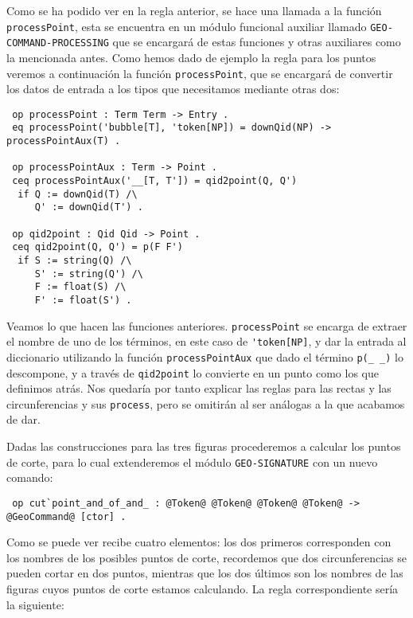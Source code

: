 Como se ha podido ver en la regla anterior, se hace una llamada a la función  \verb"processPoint", esta se encuentra en un módulo funcional auxiliar llamado \verb"GEO-COMMAND-PROCESSING" que se encargará de estas funciones y otras auxiliares como la mencionada antes. Como hemos dado de ejemplo la regla para los puntos veremos a continuación la función \verb"processPoint", que se encargará de convertir los datos de entrada a los tipos que necesitamos mediante otras dos:

{\codesize
\begin{verbatim}
 op processPoint : Term Term -> Entry .
 eq processPoint('bubble[T], 'token[NP]) = downQid(NP) -> processPointAux(T) .

 op processPointAux : Term -> Point .
 ceq processPointAux('__[T, T']) = qid2point(Q, Q')
  if Q := downQid(T) /\
     Q' := downQid(T') .

 op qid2point : Qid Qid -> Point .
 ceq qid2point(Q, Q') = p(F F')
  if S := string(Q) /\
     S' := string(Q') /\
     F := float(S) /\
     F' := float(S') .
\end{verbatim}
}

Veamos lo que hacen las funciones anteriores. \texttt{processPoint} se encarga de extraer el nombre de uno de los términos, en este caso de \verb"'token[NP]", y dar la entrada al diccionario utilizando la función \texttt{processPointAux} que dado el término \verb"p(_ _)" lo descompone, y a través de \texttt{qid2point} lo convierte en un punto como los que definimos atrás. Nos quedaría por tanto explicar las reglas para las rectas y las circunferencias y sus \verb"process", pero se omitirán al ser análogas a la que acabamos de dar.\par

Dadas las construcciones para las tres figuras procederemos a calcular los puntos de corte, para lo cual extenderemos el módulo \verb"GEO-SIGNATURE" con un nuevo comando:
{\codesize
\begin{verbatim}
 op cut`point_and_of_and_ : @Token@ @Token@ @Token@ @Token@ -> @GeoCommand@ [ctor] .
\end{verbatim}
}

Como se puede ver recibe cuatro elementos: los dos primeros corresponden con los nombres de los posibles puntos de corte, recordemos que dos circunferencias se pueden cortar en dos puntos, mientras que los dos últimos son los nombres de las figuras cuyos puntos de corte estamos calculando. La regla correspondiente sería la siguiente: \par
 
